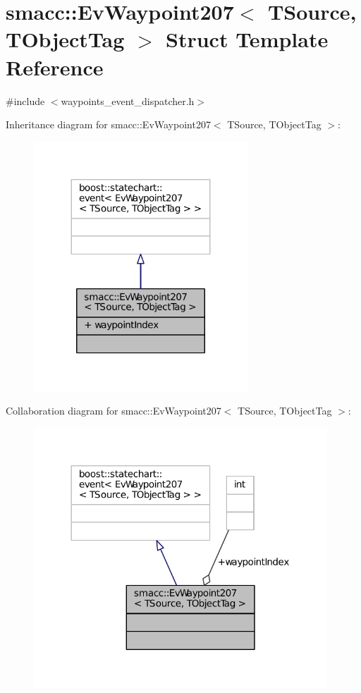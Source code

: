 \hypertarget{structsmacc_1_1EvWaypoint207}{}\section{smacc\+:\+:Ev\+Waypoint207$<$ T\+Source, T\+Object\+Tag $>$ Struct Template Reference}
\label{structsmacc_1_1EvWaypoint207}


{\ttfamily \#include $<$waypoints\+\_\+event\+\_\+dispatcher.\+h$>$}



Inheritance diagram for smacc\+:\+:Ev\+Waypoint207$<$ T\+Source, T\+Object\+Tag $>$\+:
\nopagebreak
\begin{figure}[H]
\begin{center}
\leavevmode
\includegraphics[width=227pt]{structsmacc_1_1EvWaypoint207__inherit__graph}
\end{center}
\end{figure}


Collaboration diagram for smacc\+:\+:Ev\+Waypoint207$<$ T\+Source, T\+Object\+Tag $>$\+:
\nopagebreak
\begin{figure}[H]
\begin{center}
\leavevmode
\includegraphics[width=312pt]{structsmacc_1_1EvWaypoint207__coll__graph}
\end{center}
\end{figure}
